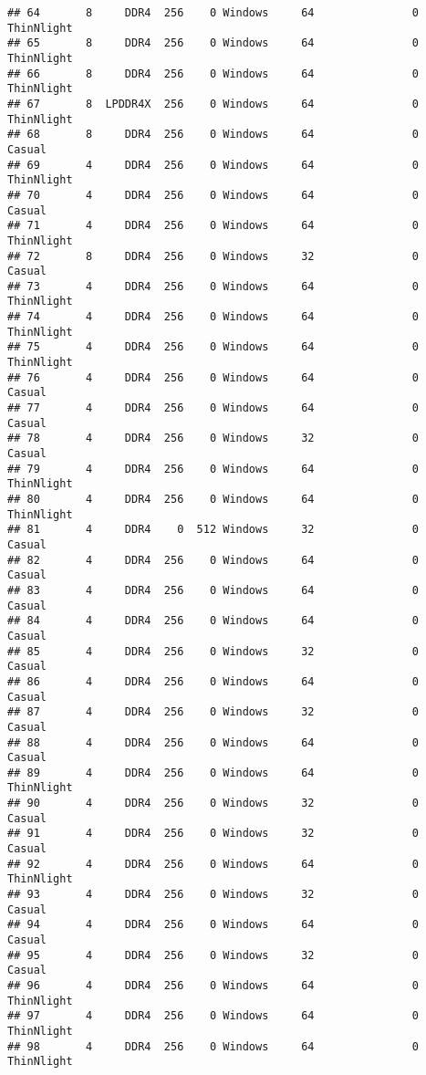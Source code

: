 \documentclass[
]{article}
\begin{document}
\begin{verbatim}
## 64       8     DDR4  256    0 Windows     64               0 ThinNlight
## 65       8     DDR4  256    0 Windows     64               0 ThinNlight
## 66       8     DDR4  256    0 Windows     64               0 ThinNlight
## 67       8  LPDDR4X  256    0 Windows     64               0 ThinNlight
## 68       8     DDR4  256    0 Windows     64               0     Casual
## 69       4     DDR4  256    0 Windows     64               0 ThinNlight
## 70       4     DDR4  256    0 Windows     64               0     Casual
## 71       4     DDR4  256    0 Windows     64               0 ThinNlight
## 72       8     DDR4  256    0 Windows     32               0     Casual
## 73       4     DDR4  256    0 Windows     64               0 ThinNlight
## 74       4     DDR4  256    0 Windows     64               0 ThinNlight
## 75       4     DDR4  256    0 Windows     64               0 ThinNlight
## 76       4     DDR4  256    0 Windows     64               0     Casual
## 77       4     DDR4  256    0 Windows     64               0     Casual
## 78       4     DDR4  256    0 Windows     32               0     Casual
## 79       4     DDR4  256    0 Windows     64               0 ThinNlight
## 80       4     DDR4  256    0 Windows     64               0 ThinNlight
## 81       4     DDR4    0  512 Windows     32               0     Casual
## 82       4     DDR4  256    0 Windows     64               0     Casual
## 83       4     DDR4  256    0 Windows     64               0     Casual
## 84       4     DDR4  256    0 Windows     64               0     Casual
## 85       4     DDR4  256    0 Windows     32               0     Casual
## 86       4     DDR4  256    0 Windows     64               0     Casual
## 87       4     DDR4  256    0 Windows     32               0     Casual
## 88       4     DDR4  256    0 Windows     64               0     Casual
## 89       4     DDR4  256    0 Windows     64               0 ThinNlight
## 90       4     DDR4  256    0 Windows     32               0     Casual
## 91       4     DDR4  256    0 Windows     32               0     Casual
## 92       4     DDR4  256    0 Windows     64               0 ThinNlight
## 93       4     DDR4  256    0 Windows     32               0     Casual
## 94       4     DDR4  256    0 Windows     64               0     Casual
## 95       4     DDR4  256    0 Windows     32               0     Casual
## 96       4     DDR4  256    0 Windows     64               0 ThinNlight
## 97       4     DDR4  256    0 Windows     64               0 ThinNlight
## 98       4     DDR4  256    0 Windows     64               0 ThinNlight

\end{verbatim}
\end{document}
